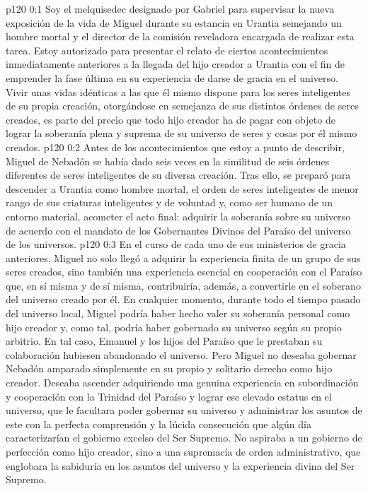 \author{Mantutia Melquisedec}
\vs p120 0:1 Soy el melquisedec designado por Gabriel para supervisar la nueva exposición de la vida de Miguel durante su estancia en Urantia semejando un hombre mortal y el director de la comisión reveladora encargada de realizar esta tarea. Estoy autorizado para presentar el relato de ciertos acontecimientos inmediatamente anteriores a la llegada del hijo creador a Urantia con el fin de emprender la fase última en su experiencia de darse de gracia en el universo. Vivir unas vidas idénticas a las que él mismo dispone para los seres inteligentes de su propia creación, otorgándose en semejanza de sus distintos órdenes de seres creados, es parte del precio que todo hijo creador ha de pagar con objeto de lograr la soberanía plena y suprema de su universo de seres y cosas por él mismo creados.
\vs p120 0:2 Antes de los acontecimientos que estoy a punto de describir, Miguel de Nebadón se había dado seis veces en la similitud de seis órdenes diferentes de seres inteligentes de su diversa creación. Tras ello, se preparó para descender a Urantia como hombre mortal, el orden de seres inteligentes de menor rango de sus criaturas inteligentes y de voluntad y, como ser humano de un entorno material, acometer el acto final: adquirir la soberanía sobre su universo de acuerdo con el mandato de los Gobernantes Divinos del Paraíso del universo de los universos.
\vs p120 0:3 En el curso de cada uno de sus ministerios de gracia anteriores, Miguel no solo llegó a adquirir la experiencia finita de un grupo de sus seres creados, sino también una experiencia esencial en cooperación con el Paraíso que, en sí misma y de sí misma, contribuiría, además, a convertirle en el soberano del universo creado por él. En cualquier momento, durante todo el tiempo pasado del universo local, Miguel podría haber hecho valer su soberanía personal como hijo creador y, como tal, podría haber gobernado su universo según su propio arbitrio. En tal caso, Emanuel y los hijos del Paraíso que le prestaban su colaboración hubiesen abandonado el universo. Pero Miguel no deseaba gobernar Nebadón amparado simplemente en su propio y solitario derecho como hijo creador. Deseaba ascender adquiriendo una genuina experiencia en subordinación y cooperación con la Trinidad del Paraíso y lograr ese elevado estatus en el universo, que le facultara poder gobernar su universo y administrar los asuntos de este con la perfecta comprensión y la lúcida consecución que algún día caracterizarían el gobierno excelso del Ser Supremo. No aspiraba a un gobierno de perfección como hijo creador, sino a una supremacía de orden administrativo, que englobara la sabiduría en los asuntos del universo y la experiencia divina del Ser Supremo.
